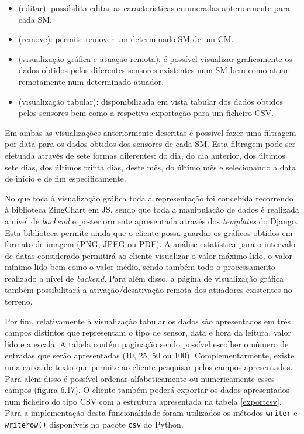 \begin{itemize}
	\item \faEdit \space (editar): possibilita editar as características enumeradas anteriormente para cada \acl{SM}. 
	\item \faTrash \space (remove): permite remover um determinado \acl{SM} de um \acl{CM}. 
	\item \faBarChart \faCogs \space (visualização gráfica e atuação remota): é possível visualizar graficamente os dados obtidos pelos diferentes sensores existentes num \acl{SM} bem como atuar remotamente num determinado atuador. 
	\item \faDatabase \space (visualização tabular): disponibilizada em vista tabular dos dados obtidos pelos sensores bem como a respetiva exportação para um ficheiro \ac{CSV}. 
\end{itemize}


Em ambas as visualizações anteriormente descritas é possível fazer uma filtragem por data para os dados obtidos dos sensores de cada \acl{SM}. Esta filtragem pode ser efetuada através de sete formas diferentes: do dia, do dia anterior, dos últimos sete dias, dos últimos trinta dias, deste mês, do último mês e selecionando a data de início e de fim especificamente. 


No que toca à visualização gráfica toda a representação foi concebida recorrendo à biblioteca ZingChart em \ac{JS}, sendo que toda a manipulação de dados é realizada a nível de \textit{backend} e posteriormente apresentada através dos \textit{templates} do Django. Esta biblioteca permite ainda que o cliente possa guardar os gráficos obtidos em formato de imagem (PNG, JPEG ou PDF).  A análise estatística para o intervalo de datas considerado permitirá ao cliente visualizar o valor máximo lido, o valor mínimo lido bem como o valor médio, sendo também todo o processamento realizado a nível de \textit{backend}. Para além disso, a página de visualização gráfica também possibilitará a ativação/desativação remota dos atuadores existentes no terreno. 


Por fim, relativamente à visualização tabular os dados são apresentados em três campos distintos que representam o tipo de sensor, data e hora da leitura, valor lido e a escala. A tabela contém paginação sendo possível escolher o número de entradas que serão apresentadas (10, 25, 50 ou 100). Complementarmente, existe uma caixa de texto que permite ao cliente pesquisar pelos campos apresentados. Para além disso é possível ordenar alfabeticamente ou numericamente esses campos (figura 6.17). O cliente também poderá exportar os dados apresentados num ficheiro do tipo \ac{CSV} com a estrutura apresentada na tabela \ref{exportcsv}. Para a implementação desta funcionalidade foram utilizados os métodos \texttt{writer} e \texttt{writerow()} disponíveis no pacote \texttt{csv} do Python.  


